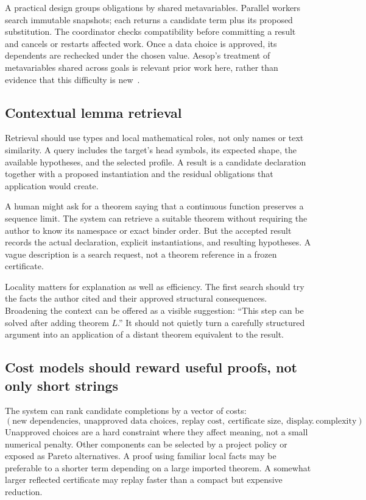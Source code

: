 \documentclass[11pt,letterpaper]{article}
\theoremstyle{definition}
\theoremstyle{remark}
\begin{document}
A practical design groups obligations by shared metavariables. Parallel workers search immutable snapshots; each returns a candidate term plus its proposed substitution. The coordinator checks compatibility before committing a result and cancels or restarts affected work. Once a data choice is approved, its dependents are rechecked under the chosen value. Aesop's treatment of metavariables shared across goals is relevant prior work here, rather than evidence that this difficulty is new~\cite{aesop}.

\subsection{Contextual lemma retrieval}
Retrieval should use types and local mathematical roles, not only names or text similarity. A query includes the target's head symbols, its expected shape, the available hypotheses, and the selected profile. A result is a candidate declaration together with a proposed instantiation and the residual obligations that application would create.

A human might ask for a theorem saying that a continuous function preserves a sequence limit. The system can retrieve a suitable theorem without requiring the author to know its namespace or exact binder order. But the accepted result records the actual declaration, explicit instantiations, and resulting hypotheses. A vague description is a search request, not a theorem reference in a frozen certificate.

Locality matters for explanation as well as efficiency. The first search should try the facts the author cited and their approved structural consequences. Broadening the context can be offered as a visible suggestion: ``This step can be solved after adding theorem $L$.'' It should not quietly turn a carefully structured argument into an application of a distant theorem equivalent to the result.

\subsection{Cost models should reward useful proofs, not only short strings}
The system can rank candidate completions by a vector of costs:
\[
 (\text{new dependencies},\ \text{unapproved data choices},\
 \text{replay cost},\ \text{certificate size},\ \text{display complexity}).
\]
Unapproved choices are a hard constraint where they affect meaning, not a small numerical penalty. Other components can be selected by a project policy or exposed as Pareto alternatives. A proof using familiar local facts may be preferable to a shorter term depending on a large imported theorem. A somewhat larger reflected certificate may replay faster than a compact but expensive reduction.
\end{document}
